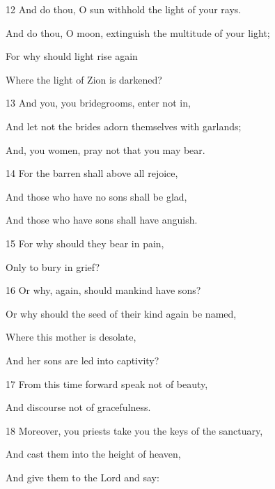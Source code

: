 \par 12 And do thou, O sun withhold the light of your rays.

\par And do thou, O moon, extinguish the multitude of your light;

\par For why should light rise again

\par Where the light of Zion is darkened?

\par 13 And you, you bridegrooms, enter not in,

\par And let not the brides adorn themselves with garlands;

\par And, you women, pray not that you may bear.

\par 14 For the barren shall above all rejoice,

\par And those who have no sons shall be glad,

\par And those who have sons shall have anguish.

\par 15 For why should they bear in pain,

\par Only to bury in grief?

\par 16 Or why, again, should mankind have sons?

\par Or why should the seed of their kind again be named,

\par Where this mother is desolate,

\par And her sons are led into captivity?

\par 17 From this time forward speak not of beauty,

\par And discourse not of gracefulness.

\par 18 Moreover, you priests take you the keys of the sanctuary,

\par And cast them into the height of heaven,

\par And give them to the Lord and say:

